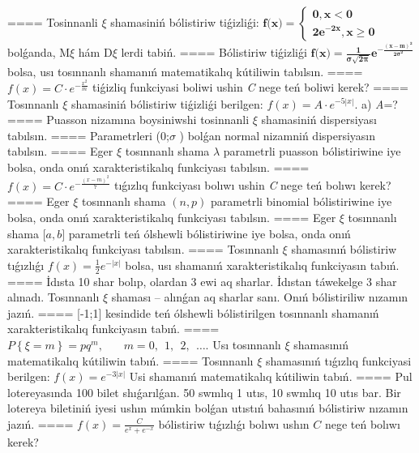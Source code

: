 ====
Tosinnanli $\xi$ shamasiniń bólistiriw tiǵizliǵi: \(\mathbf{f}\mathbf{(}\mathbf{x}\mathbf{)}\mathbf{=}\left\{ \begin{matrix}
\mathbf{0,}\mathbf{x <}\mathbf{0} \\
\mathbf{2}\mathbf{e}^{\mathbf{-}\mathbf{2}\mathbf{x}}\mathbf{,}\mathbf{x \geq}\mathbf{0}
\end{matrix} \right.\ \) bolǵanda, M$\xi$ hám D$\xi$ lerdi tabiń.
====
Bólistiriw tiǵizliǵi \(\mathbf{f}\mathbf{(}\mathbf{x}\mathbf{)}\mathbf{=}\frac{\mathbf{1}}{\mathbf{\sigma}\sqrt{\mathbf{2}\mathbf{\pi}}}\mathbf{e}^{\mathbf{-}\frac{\left( \mathbf{x - m} \right)^{\mathbf{2}}}{\mathbf{2}\mathbf{\sigma}^{\mathbf{2}}}}\)bolsa, usı tosınnanlı shamanıń matematikalıq kútiliwin tabılsın.
====
\(f(x) = C \cdot e^{- \frac{x^{2}}{m}}\) tiǵizliq funkciyasi boliwi ushin \emph{C} nege teń boliwi kerek?
====
Tosınnanlı $\xi$ shamasiniń bólistiriw tiǵizliǵi berilgen: \(f(x) = A \cdot e^{- 5|x|}\). a) \emph{A}=?
====
Puasson nizamına boysiniwshi tosinnanli $\xi$ shamasiniń dispersiyası tabılsın.
====
Parametrleri (0;$\sigma$ ) bolǵan normal nizamniń dispersiyasın tabılsın.
====
Eger \(\xi\) tosınnanlı shama \(\lambda\) parametrli puasson bólistiriwine iye bolsa, onda onıń xarakteristikalıq funkciyası tabılsın.
====
\(f(x) = C \cdot e^{- \frac{(x - m)^{2}}{7}}\) tıǵızlıq funkciyası bolıwı ushin \emph{C} nege teń bolıwı kerek?
====
Eger \(\xi\) tosınnanlı shama \((n,p)\) parametrli binomial bólistiriwine iye bolsa, onda onıń xarakteristikalıq funkciyası tabılsın.
====
Eger \(\xi\) tosınnanlı shama \(\lbrack a,b\rbrack\) parametrli teń ólshewli bólistiriwine iye bolsa, onda onıń xarakteristikalıq funkciyası tabılsın.
====
Tosınnanlı \(\xi\) shamasınıń bólistiriw tıǵızlıǵı \(f(x) = \frac{1}{2}e^{- |x|}\) bolsa, usı shamanıń xarakteristikalıq funkciyasın tabıń.
====
İdısta 10 shar bolıp, olardan 3 ewi aq sharlar. İdıstan táwekelge 3 shar alınadı. Tosınnanlı \(\xi\) shaması -- alınǵan aq sharlar sanı. Onıń bólistiriliw nızamın jazıń.
====
{[}-1;1{]} kesindide teń ólshewli bólistirilgen tosınnanlı shamanıń xarakteristikalıq funkciyasın tabıń.
====
\(P\left\{ \xi = m \right\} = pq^{m},\ \ \ \ \ \ \ \ m = 0,\ \ 1,\ \ 2,\ \ \ldots\). Usı tosınnanlı $\xi$ shamasınıń matematikalıq kútiliwin tabıń.
====
Tosınnanlı $\xi$ shamasınıń tıǵızlıq funkciyasi berilgen: \(f(x) = e^{- 3|x|}\) Usi shamanıń matematikalıq kútiliwin tabıń.
====
Pul lotereyasında 100 bilet shıǵarılǵan. 50 swmlıq 1 utıs, 10 swmlıq 10 utıs bar. Bir lotereya biletiniń iyesi ushın múmkin bolǵan utıstıń bahasınıń bólistiriw nızamın jazıń.
====
\(f(x) = \frac{C}{e^{x} + e^{- x}}\) bólistiriw tıǵızlıǵı bolıwı ushın \(C\) nege teń bolıwı kerek?
